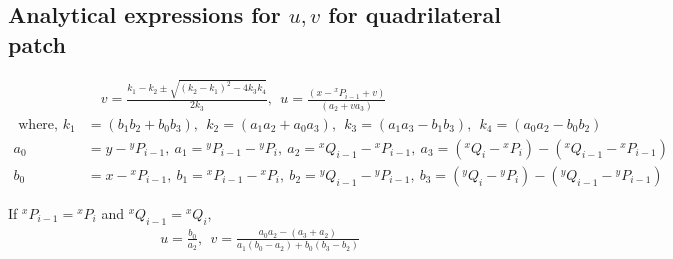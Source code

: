 \documentclass[12pt,a4]{article}
\begin{document}
\subsection{Analytical expressions for $u,v$ for quadrilateral patch}\label{app:Analylit_u_v_quad}
\begin{align}
&\quad {v} = \frac{k_1-k_2\pm \sqrt{\left(k_2-k_1\right)^2-4k_3k_4}}{2k_3},~~{u} = \frac{\left(x-{}^xP_{i-1}+{v}\right)}{\left( a_2+{v} a_3 \right)}\\
\nonumber\text{ where, }k_1 &= \left(b_1b_2+b_0b_3 \right),~~k_2 = \left(a_1a_2+a_0a_3 \right),~~
k_3 = \left(a_1a_3-b_1b_3 \right),~~k_4=\left(a_0a_2-b_0b_2 \right)\\
\nonumber a_0 &= y-{}^yP_{i-1},~a_1 = {}^yP_{i-1}-{}^yP_i,~a_2 = {}^xQ_{i-1}-{}^xP_{i-1},~a_3 = \left({}^xQ_{i}-{}^xP_i\right)-\left({}^xQ_{i-1}-{}^xP_{i-1}\right)\\
\nonumber b_0 &= x-{}^xP_{i-1},~b_1 = {}^xP_{i-1}-{}^xP_i,~b_2 = {}^yQ_{i-1}-{}^yP_{i-1},~b_3 = \left({}^yQ_{i}-{}^yP_i\right)-\left({}^yQ_{i-1}-{}^yP_{i-1}\right)
\end{align}

If ${}^xP_{i-1}={}^xP_{i}$ and ${}^xQ_{i-1}={}^xQ_{i}$, 
\begin{align}
{u} = \frac{b_0}{a_2},~~{v} = \frac{a_0a_2-\left(a_3+a_2 \right)}{a_1\left(b_0-a_2\right)+b_0\left(b_3-b_2 \right)}
\end{align}
\end{document}
